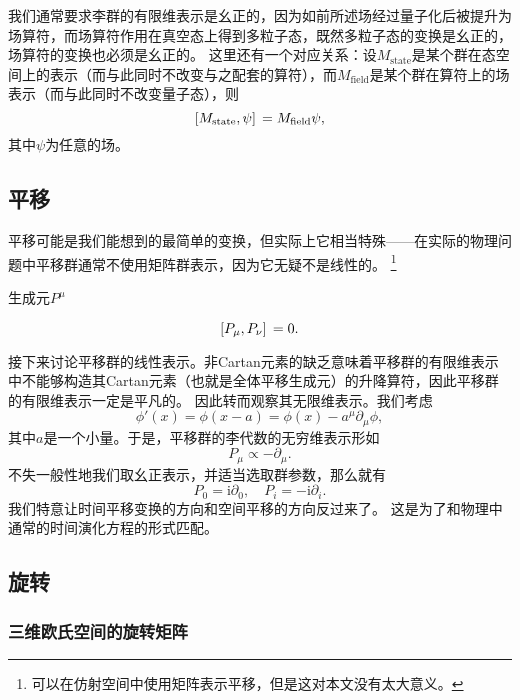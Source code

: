 \documentclass[hyperref, UTF8, a4paper]{ctexart}
\newcommand*{\ii}{\mathrm{i}}
\begin{document}
我们通常要求李群的有限维表示是幺正的，因为如前所述场经过量子化后被提升为场算符，而场算符作用在真空态上得到多粒子态，既然多粒子态的变换是幺正的，场算符的变换也必须是幺正的。
这里还有一个对应关系：设$M_\text{state}$是某个群在态空间上的表示（而与此同时不改变与之配套的算符），而$M_\text{field}$是某个群在算符上的场表示（而与此同时不改变量子态），则
\begin{equation}
    \comm*{M_\text{state}}{\psi} = M_\text{field} \psi,
    \label{eq:field-and-state-corr}
\end{equation}
其中$\psi$为任意的场。

\subsection{平移}\label{sec:translation}

平移可能是我们能想到的最简单的变换，但实际上它相当特殊——在实际的物理问题中平移群通常不使用矩阵群表示，因为它无疑不是线性的。%
\footnote{可以在仿射空间中使用矩阵表示平移，但是这对本文没有太大意义。}

生成元$P^\mu$

\begin{equation}
    \comm*{P_\mu}{P_\nu} = 0.
    \label{eq:comm-of-trans}
\end{equation}

接下来讨论平移群的线性表示。非Cartan元素的缺乏意味着平移群的有限维表示中不能够构造其Cartan元素（也就是全体平移生成元）的升降算符，因此平移群的有限维表示一定是平凡的。
因此转而观察其无限维表示。我们考虑
\[
    \phi'(x) = \phi(x - a) = \phi(x) - a^\mu \partial_\mu \phi,
\]
其中$a$是一个小量。于是，平移群的李代数的无穷维表示形如
\[
    P_\mu \propto - \partial_\mu.
\]
不失一般性地我们取幺正表示，并适当选取群参数，那么就有
\begin{equation}
    P_0 = \ii \partial_0, \quad P_i = - \ii \partial_i.
    \label{eq:transition-inf-rep}
\end{equation}
我们特意让时间平移变换的方向和空间平移的方向反过来了。
这是为了和物理中通常的时间演化方程的形式匹配。

\subsection{旋转}\label{sec:rotation}

\subsubsection{三维欧氏空间的旋转矩阵}
\end{document}
